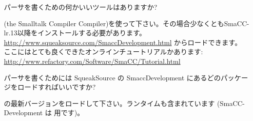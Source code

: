 \documentclass[a4paper,10pt,twoside]{book}
\begin{document}
\begin{faq}
パーサを書くための何かいいツールはありますか?
\end{faq}
\answer
{}(the Smalltalk Compiler Compiler)を使って下さい。その場合少なくともSmaCC-lr.13以降をインストールする必要があります。
\url{http://www.squeaksource.com/SmaccDevelopment.html} からロードできます。
ここにはとても良くできたオンラインチュートリアルかあります:
\url{http://www.refactory.com/Software/SmaCC/Tutorial.html}

\begin{faq}
パーサを書くためには SqueakSource の SmaccDevelopment にあるどのパッケージをロードすればいいですか?
\end{faq}
\answer
{} の最新バージョンをロードして下さい。ランタイムも含まれています
(SmaCC-Development は  用です)。

\ifx\wholebook\relax\else
\end{document}
